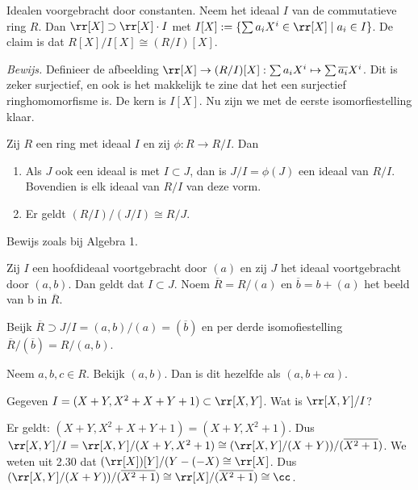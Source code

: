 \documentclass[a4paper,12pt,oneside]{book}
\begin{document}
\begin{voorbeeld}
Idealen voorgebracht door constanten. Neem het ideaal $I$ van de commutatieve ring $R$. Dan $\rr[X] \supset \rr[X]\cdot I$ met $I[X] := \{ \sum a_i X^i \in \rr[X] \mid a_i \in I\}$. De claim is dat $R[X]/I[X] \cong (R/I)[X]$.
 
\textit{Bewijs. } Definieer de afbeelding $\rr[X] \to (R/I)[X] : \sum a_i X^i \mapsto \sum \overline{a_i} X^i$. Dit is zeker surjectief, en ook is het makkelijk te zine dat het een surjectief ringhomomorfisme is. De kern is $I[X]$. Nu zijn we met de eerste isomorfiestelling klaar.
\end{voorbeeld}

\begin{stelling}
Zij $R$ een ring met ideaal $I$ en zij $\phi : R \to R/I$. Dan
\begin{enumerate}[label=(\roman*)]
\item Als $J$ ook een ideaal is met $I \subset J$, dan is $J/I = \phi(J)$ een ideaal van $R/I$. Bovendien is elk ideaal van $R/I$ van deze vorm.
\item Er geldt $(R/I)/(J/I) \cong R/J$.
\end{enumerate}
\end{stelling}
\begin{bewijs}
Bewijs zoals bij Algebra 1.
\end{bewijs}

\begin{voorbeeld}
Zij $I$ een hoofdideaal voortgebracht door $(a)$ en zij $J$ het ideaal voortgebracht door $(a,b)$. Dan geldt dat $I \subset J$. Noem $\overline{R} = R/(a)$ en $\overline{b} = b + (a)$ het beeld van b in $\overline{R}$. 

Beijk $\overline{R} \supset J/I = (a,b)/(a)= (\overline{b}) $ en per derde isomofiestelling $\overline{R}/(\overline{b}) = R/(a,b)$. 
\end{voorbeeld}
\begin{opmerking}
Neem $a,b,c \in R$. Bekijk $(a,b)$. Dan is dit hezelfde als $(a, b+ca)$.
\end{opmerking}
\begin{voorbeeld}
Gegeven $I=(X+Y, X^2 +X  + Y + 1) \subset \rr[X,Y]$. Wat is $\rr[X,Y]/I$?

Er geldt: $(X+Y, X^2 +X  + Y + 1) = (X+Y, X^2 + 1)$. Dus $\rr[X,Y]/I = \rr[X,Y]/(X+Y, X^2 + 1) \cong (\rr[X,Y]/(X+Y))/(\overline{X^2 + 1})$. We weten uit 2.30 dat $(\rr[X])[Y]/(Y-(-X) \cong \rr[X]$. Dus 
$(\rr[X,Y]/(X+Y))/(\overline{X^2 + 1}) \cong \rr[X]/(\overline{X^2 + 1}) \cong \cc$.
\end{voorbeeld}
\end{document}
